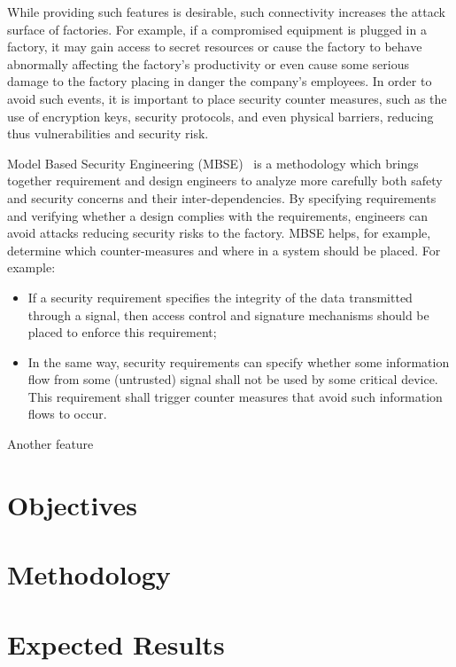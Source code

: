While providing such features is desirable, such connectivity increases the attack surface of factories. For example, if a compromised equipment is plugged in a factory, it may gain access to secret resources or cause the factory to behave abnormally affecting the factory's productivity or even cause some serious damage to the factory placing in danger the company's employees. In order to avoid such events, it is important to place security counter measures, such as the use of encryption keys, security protocols, and even physical barriers, reducing thus vulnerabilities and security risk. 

Model Based Security Engineering (MBSE)~\cite{umlsec,casesec} is a methodology which brings together requirement and design engineers to analyze more carefully both safety and security concerns and their inter-dependencies. By specifying requirements and verifying whether a design complies with the requirements, engineers can avoid attacks reducing security risks to the factory. MBSE helps, for example, determine which counter-measures and where in a system  should be placed. For example:
\begin{itemize}
  \item If a security requirement specifies the integrity of the data transmitted through a signal, then  access control and signature mechanisms should be placed to enforce this requirement;

  \item In the same way, security requirements can specify whether some information flow from some (untrusted) signal shall not be used by some critical device. This requirement shall trigger counter measures that avoid such information flows to occur.
\end{itemize}

Another feature 

  
\section{Objectives}

\section{Methodology}



\section{Expected Results}


 


